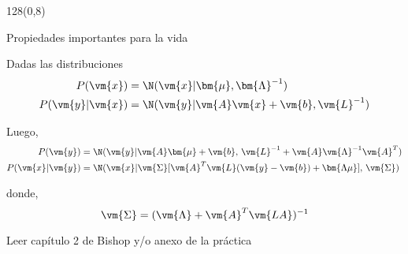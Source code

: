 \documentclass[shownotes]{beamer}
\begin{document}
\begin{frame}
\begin{textblock}{128}(0,8)
\begin{center}
 \normalsize Propiedades importantes para la vida
\end{center}
\end{textblock}
\vspace{0.75cm}

\tiny

Dadas las distribuciones
\begin{align*}
    P(\vm{x}) &=  \N(\vm{x}|\bm{\mu},\bm{\Lambda}^{-1}) \\
   P(\vm{y}|\vm{x}) &=  \N(\vm{y}|\vm{A}\vm{x}+\vm{b},\vm{L}^{-1})    
\end{align*}


 Luego,  
\begin{align*}
    P(\vm{y}) &=  \N(\vm{y}|\vm{A}\bm{\mu}+\vm{b},\, \vm{L}^{-1} + \vm{A}\vm{\Lambda}^{-1}\vm{A}^T) \\
   P(\vm{x}|\vm{y}) &=  \N(\vm{x}|\vm{\Sigma}[\vm{A}^T \vm{L}(\vm{y}-\vm{b})+ \bm{\Lambda\mu}],\,  \vm{\Sigma})\label{eq:post}
\end{align*}

donde, 
\begin{equation*}
 \vm{\Sigma} = (\vm{\Lambda} + \vm{A}^T \vm{LA} )^{-1}
\end{equation*}

\vspace{0.3cm}

\small
\begin{mdframed}[backgroundcolor=black!15]\centering
 Leer cap\'itulo 2 de Bishop y/o anexo de la pr\'actica
\end{mdframed}

\end{frame}
\end{document}

